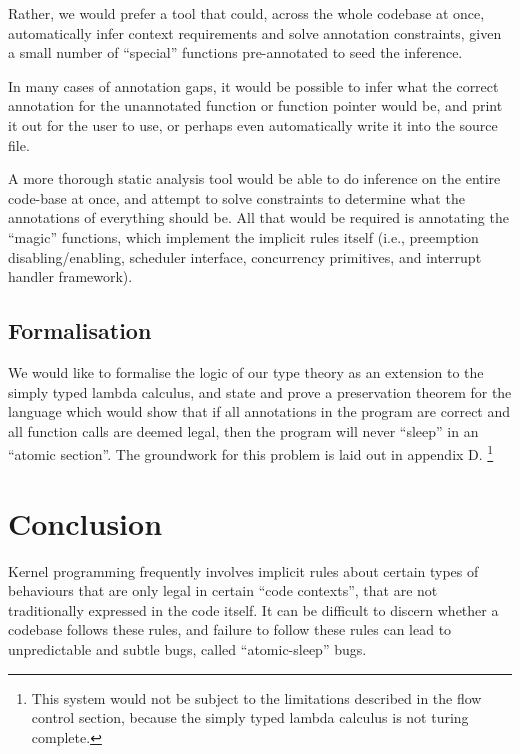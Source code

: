 \documentclass{article}
\begin{document}
Rather, we would prefer a tool that could, across the whole codebase at once, automatically infer context requirements and solve annotation constraints, given a small number of ``special'' functions pre-annotated to seed the inference.

In many cases of annotation gaps, it would be possible to infer what the correct annotation for the unannotated function or function pointer would be, and print it out for the user to use, or perhaps even automatically write it into the source file.

A more thorough static analysis tool would be able to do inference on the entire code-base at once, and attempt to solve constraints to determine what the annotations of everything should be.
All that would be required is annotating the ``magic'' functions, which implement the implicit rules itself (i.e., preemption disabling/enabling, scheduler interface, concurrency primitives, and interrupt handler framework).

\subsection{Formalisation}

We would like to formalise the logic of our type theory as an extension to the simply typed lambda calculus, and state and prove a preservation theorem for the language which would show that if all annotations in the program are correct and all function calls are deemed legal, then the program will never ``sleep'' in an ``atomic section''.
The groundwork for this problem is laid out in appendix D.
\footnote{This system would not be subject to the limitations described in the flow control section, because the simply typed lambda calculus is not turing complete.}


\section{Conclusion}

Kernel programming frequently involves implicit rules about certain types of behaviours that are only legal in certain ``code contexts'', that are not traditionally expressed in the code itself. It can be difficult to discern whether a codebase follows these rules, and failure to follow these rules can lead to unpredictable and subtle bugs, called ``atomic-sleep'' bugs.
\end{document}
